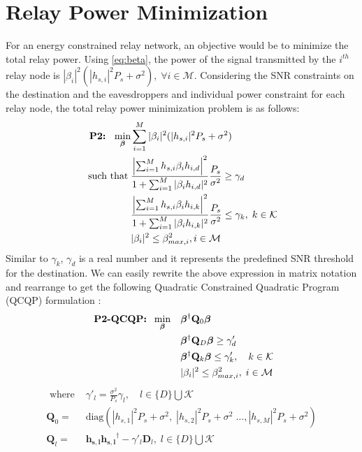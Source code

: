 \documentclass[journal,,draftclsnofoot letterpaper, onecolumn]{IEEEtran}
\begin{document}
\section{Relay Power Minimization}
\label{POW}
   For an energy constrained relay network, an objective would be to minimize the total relay power. Using \eqref{eq:beta}, the power of the signal transmitted by the $i^{th}$ relay node is $|\beta_i|^2 (|h_{s,i}|^2 P_s + \sigma^2),\;\forall i \in \mathcal{M}$. Considering the SNR constraints on the destination and the eavesdroppers and individual power constraint for each relay node, the total relay power minimization problem is as follows:
\begin{subequations}\label{prob1}
   \begin{align}
   \text{\textbf{ P2:} }\; \min_{\bm{\beta}} & \sum\limits_{i=1}^{M}|\beta_i|^2 (|h_{s,i}|^2 P_s + \sigma^2)\\
   \text{such that}\; & \frac{\left| \sum_{i=1}^{M} h_{s,i}\beta_ih_{i,d}\right| ^2}{1 + \sum_{i=1}^{M}|\beta_i h_{i,d}|^2}\frac{P_s}{\sigma^2} \ge \gamma_d \label{prob1cons1}  \\
   		& \frac{\left| \sum_{i=1}^{M} h_{s,i} \beta_i h_{i,k}\right| ^2}{1 + \sum_{i=1}^{M}|\beta_ih_{i,k}|^2}\frac{P_s}{\sigma^2} \le \gamma_k, \; k \in \mathcal{K} \label{prob1cons2}\\
    		&|\beta_i|^2 \le \beta_{max,i}^2, i \in \mathcal{M}
   \end{align}
   \end{subequations}
   Similar to $\gamma_k$, $\gamma_d$ is a real number and it represents the predefined SNR threshold for the destination.
We can easily rewrite the above expression in matrix notation and rearrange to get the following Quadratic Constrained Quadratic Program (QCQP) formulation \cite{ANDREA}:
   \begin{align*}
   \text{\textbf{ P2-QCQP:} } 
   \;\min_{\bm{\beta}} \quad & \boldsymbol{\beta}^\dagger\mathbf{Q}_0\boldsymbol{\beta} \\
   & \boldsymbol{\beta}^\dagger\mathbf{Q}_D\boldsymbol{\beta} \ge \gamma'_d \\
   & \boldsymbol{\beta}^\dagger\mathbf{Q}_{k}\boldsymbol{\beta} \le \gamma'_{k} , \quad k \in \mathcal{K} \\
   & |\beta_i|^2 \le \beta_{max,i}^2, \; i \in \mathcal{M}
   \end{align*}
   \begin{align*}
   \text{ where }&\gamma'_l = \frac{\sigma^2}{P_s}\gamma_l,\quad l \in \{D\}\bigcup\mathcal{K}\\
   \mathbf{Q}_0= &\text{diag}(|h_{s,1}|^2P_s+\sigma^2,\;|h_{s,2}|^2P_s+\sigma^2
    \;\dots ,|h_{s,M}|^2P_s+\sigma^2)\\
   \mathbf{Q}_l= &\mathbf{h_{s,l}h_{s,l}}^\dagger-\gamma'_l\mathbf{D}_l,\;l \in \{D\} \bigcup \mathcal{K}
   \end{align*}
\end{document}
